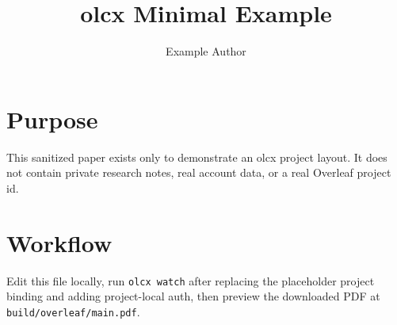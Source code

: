 \documentclass{article}
\title{olcx Minimal Example}
\author{Example Author}
\date{}
\begin{document}
\maketitle

\section{Purpose}

This sanitized paper exists only to demonstrate an olcx project layout. It does
not contain private research notes, real account data, or a real Overleaf
project id.

\section{Workflow}

Edit this file locally, run \texttt{olcx watch} after replacing the placeholder
project binding and adding project-local auth, then preview the downloaded PDF
at \texttt{build/overleaf/main.pdf}.
\end{document}
